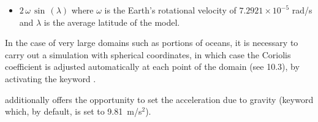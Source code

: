 \begin{itemize}
\item  $2\, \omega \, \sin \, \left(\lambda \right)$ where $\omega$ is the
Earth's rotational velocity of $7.2921 \times {10}^{-5}$ rad/s and $\lambda$ is the
average latitude of the model.
\end{itemize}

In the case of very large domains such as portions of oceans, it is necessary
to carry out a simulation with spherical coordinates, in which case the
Coriolis coefficient is adjusted automatically at each point of the domain (see
10.3), by activating the keyword .

 additionally offers the opportunity to set the acceleration due to
gravity (keyword  which, by
default, is set to 9.81~m/s${}^{2}$).
